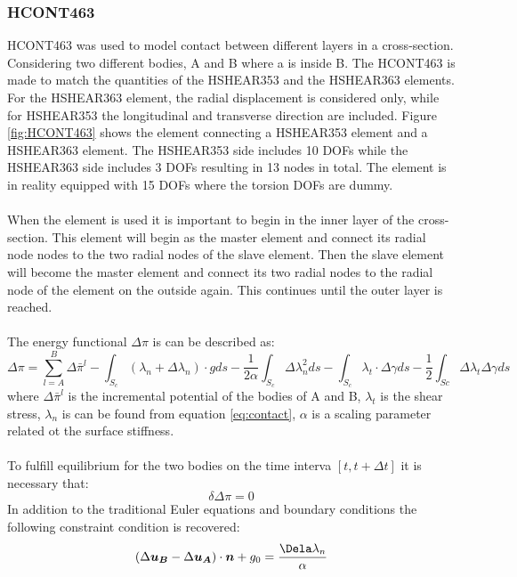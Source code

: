 \subsubsection{HCONT463}
HCONT463 was used to model contact between different layers in a cross-section.  Considering two different bodies, A and B where a is inside B. The HCONT463 is made to match the quantities of the HSHEAR353 and the HSHEAR363 elements. For the HSHEAR363 element, the radial displacement is considered only, while for HSHEAR353 the longitudinal and transverse direction are included. Figure \ref{fig:HCONT463} shows the element connecting a HSHEAR353 element and a HSHEAR363 element. The HSHEAR353 side includes 10 DOFs while the HSHEAR363 side includes 3 DOFs resulting in 13 nodes in total. The element is in reality equipped with 15 DOFs where the torsion DOFs are dummy.\\\\ When the element is used it is important to begin in the inner layer of the cross-section. This element will begin as the master element and connect its radial node nodes to the two radial nodes of the slave element. Then the slave element will become the master element and connect its two radial nodes to the radial node of the element on the outside again. This continues until the outer layer is reached.\\\\The energy functional $\Delta \pi$ is can be described as:
\begin{equation}
    \Delta \pi = \sum_{l=A}^B \Delta \bar{\pi}^{l} - \int_{S_c} (\lambda_n + \Delta \lambda_n) \cdot gds - \frac{1}{2 \alpha} \int_{S_c} \Delta \lambda_n^2 ds - \int_{S_c} \lambda_t \cdot \Delta \gamma ds - \frac{1}{2} \int_{Sc} \Delta \lambda_t \Delta \gamma ds
    \label{eq:energy}
\end{equation}
where $\Delta \bar{\pi}^{l}$ is the incremental potential of the bodies of A and B, $\lambda_t$ is the shear stress, $\lambda_n$ is can be found from equation \ref{eq:contact}, $\alpha$ is a scaling parameter related ot the surface stiffness. \\\\ To fulfill equilibrium for the two bodies on the time interva $[t,t+\Delta t]$ it is necessary that:
\begin{equation}
    \delta \Delta \pi =0
\end{equation}
In addition to the traditional Euler equations and boundary conditions the following constraint condition is recovered: 
\begin{equation}
    (\Delta \boldsymbol{u_B} - \Delta \boldsymbol{u_A}) \cdot \boldsymbol{n} + g_0=\frac{\Dela \lambda_n}{\alpha}
    \label{eq:contact}
\end{equation}
